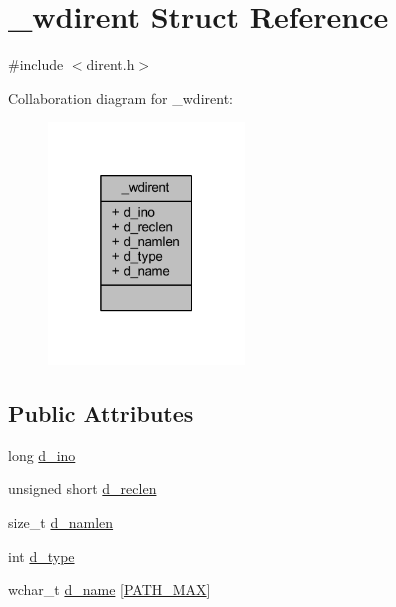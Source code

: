 \hypertarget{struct__wdirent}{\section{\+\_\+wdirent Struct Reference}
\label{struct__wdirent}
}


{\ttfamily \#include $<$dirent.\+h$>$}



Collaboration diagram for \+\_\+wdirent\+:\nopagebreak
\begin{figure}[H]
\begin{center}
\leavevmode
\includegraphics[width=148pt]{struct__wdirent__coll__graph}
\end{center}
\end{figure}
\subsection*{Public Attributes}
\begin{DoxyCompactItemize}
\item 
long \hyperlink{struct__wdirent_ac8cfaf294a0b6a49287d3f384c280c93}{d\+\_\+ino}
\item 
unsigned short \hyperlink{struct__wdirent_aff7f360608e576cd18cf11f2caf13ef3}{d\+\_\+reclen}
\item 
size\+\_\+t \hyperlink{struct__wdirent_a0050d6131e6fa90206903e216b38799e}{d\+\_\+namlen}
\item 
int \hyperlink{struct__wdirent_a3c3874604ffccbeeaffd96709763cc3b}{d\+\_\+type}
\item 
wchar\+\_\+t \hyperlink{struct__wdirent_a267f915cd36cad5969337a9192cab567}{d\+\_\+name} \mbox{[}\hyperlink{dirent_8h_ae688d728e1acdfe5988c7db45d6f0166}{P\+A\+T\+H\+\_\+\+M\+A\+X}\mbox{]}
\end{DoxyCompactItemize}


